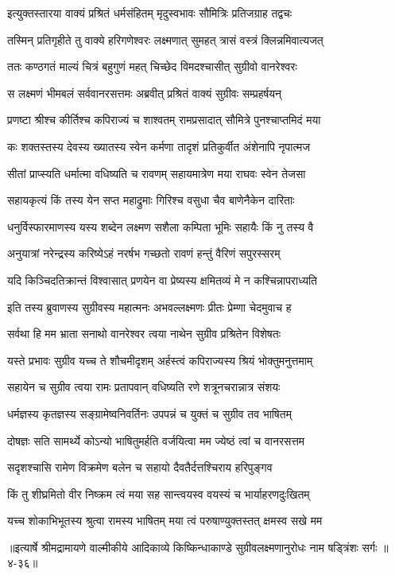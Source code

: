 
\twolineshloka
{इत्युक्तस्तारया वाक्यं प्रश्रितं धर्मसंहितम्}
{मृदुस्वभावः सौमित्रिः प्रतिजग्राह तद्वचः} %

\twolineshloka
{तस्मिन् प्रतिगृहीते तु वाक्ये हरिगणेश्वरः}
{लक्ष्मणात् सुमहत् त्रासं वस्त्रं क्लिन्नमिवात्यजत्} %

\twolineshloka
{ततः कण्ठगतं माल्यं चित्रं बहुगुणं महत्}
{चिच्छेद विमदश्चासीत् सुग्रीवो वानरेश्वरः} %

\twolineshloka
{स लक्ष्मणं भीमबलं सर्ववानरसत्तमः}
{अब्रवीत् प्रश्रितं वाक्यं सुग्रीवः सम्प्रहर्षयन्} %

\twolineshloka
{प्रणष्टा श्रीश्च कीर्तिश्च कपिराज्यं च शाश्वतम्}
{रामप्रसादात् सौमित्रे पुनश्चाप्तमिदं मया} %

\twolineshloka
{कः शक्तस्तस्य देवस्य ख्यातस्य स्वेन कर्मणा}
{तादृशं प्रतिकुर्वीत अंशेनापि नृपात्मज} %

\twolineshloka
{सीतां प्राप्स्यति धर्मात्मा वधिष्यति च रावणम्}
{सहायमात्रेण मया राघवः स्वेन तेजसा} %

\twolineshloka
{सहायकृत्यं किं तस्य येन सप्त महाद्रुमाः}
{गिरिश्च वसुधा चैव बाणेनैकेन दारिताः} %

\twolineshloka
{धनुर्विस्फारमाणस्य यस्य शब्देन लक्ष्मण}
{सशैला कम्पिता भूमिः सहायैः किं नु तस्य वै} %

\twolineshloka
{अनुयात्रां नरेन्द्रस्य करिष्येऽहं नरर्षभ}
{गच्छतो रावणं हन्तुं वैरिणं सपुरस्सरम्} %

\twolineshloka
{यदि किञ्चिदतिक्रान्तं विश्वासात् प्रणयेन वा}
{प्रेष्यस्य क्षमितव्यं मे न कश्चिन्नापराध्यति} %

\twolineshloka
{इति तस्य ब्रुवाणस्य सुग्रीवस्य महात्मनः}
{अभवल्लक्ष्मणः प्रीतः प्रेम्णा चेदमुवाच ह} %

\twolineshloka
{सर्वथा हि मम भ्राता सनाथो वानरेश्वर}
{त्वया नाथेन सुग्रीव प्रश्रितेन विशेषतः} %

\twolineshloka
{यस्ते प्रभावः सुग्रीव यच्च ते शौचमीदृशम्}
{अर्हस्त्वं कपिराज्यस्य श्रियं भोक्तुमनुत्तमाम्} %

\twolineshloka
{सहायेन च सुग्रीव त्वया रामः प्रतापवान्}
{वधिष्यति रणे शत्रूनचरान्नात्र संशयः} %

\twolineshloka
{धर्मज्ञस्य कृतज्ञस्य सङ्ग्रामेष्वनिवर्तिनः}
{उपपन्नं च युक्तं च सुग्रीव तव भाषितम्} %

\twolineshloka
{दोषज्ञः सति सामर्थ्ये कोऽन्यो भाषितुमर्हति}
{वर्जयित्वा मम ज्येष्ठं त्वां च वानरसत्तम} %

\twolineshloka
{सदृशश्चासि रामेण विक्रमेण बलेन च}
{सहायो दैवतैर्दत्तश्चिराय हरिपुङ्गव} %

\twolineshloka
{किं तु शीघ्रमितो वीर निष्क्रम त्वं मया सह}
{सान्त्वयस्व वयस्यं च भार्याहरणदुःखितम्} %

\twolineshloka
{यच्च शोकाभिभूतस्य श्रुत्वा रामस्य भाषितम्}
{मया त्वं परुषाण्युक्तस्तत् क्षमस्व सखे मम} %


॥इत्यार्षे श्रीमद्रामायणे वाल्मीकीये आदिकाव्ये किष्किन्धाकाण्डे सुग्रीवलक्ष्मणानुरोधः नाम षड्त्रिंशः सर्गः ॥४-३६॥
